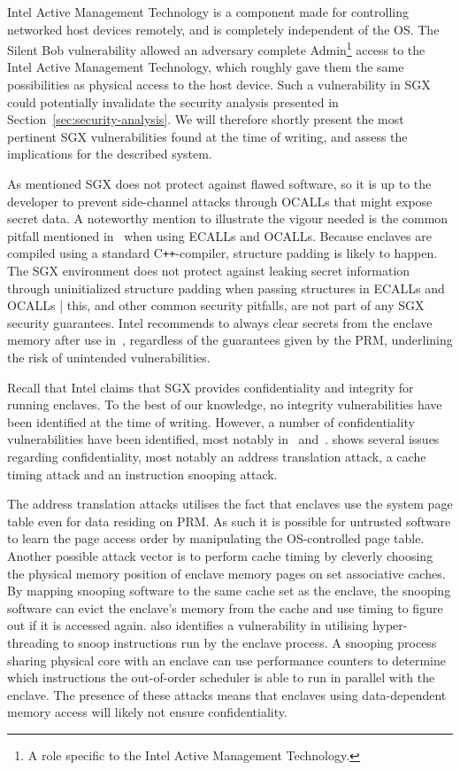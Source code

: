 \documentclass{article}
\newcommand\cpp{C\texttt{++}\xspace}
\begin{document}
    Intel Active Management Technology is a component made for controlling networked host devices remotely, and is completely independent of the OS.
    The Silent Bob vulnerability allowed an adversary complete Admin\footnote{A role specific to the Intel Active Management Technology.} access to the Intel Active Management Technology, which roughly gave them the same possibilities as physical access to the host device.
    Such a vulnerability in SGX could potentially invalidate the security analysis presented in Section~\ref{sec:security-analysis}.
    We will therefore shortly present the most pertinent SGX vulnerabilities found at the time of writing, and assess the implications for the described system.

    As mentioned SGX does not protect against flawed software, so it is up to the developer to prevent side-channel attacks through OCALLs that might expose secret data.
	A noteworthy mention to illustrate the vigour needed is the common pitfall mentioned in~\cite{intel_sgx_guide} when using ECALLs and OCALLs.
	Because enclaves are compiled using a standard \cpp-compiler, structure padding is likely to happen.
	The SGX environment does not protect against leaking secret information through uninitialized structure padding when passing structures in ECALLs and OCALLs | this, and other common security pitfalls, are not part of any SGX security guarantees.
	Intel recommends to always clear secrets from the enclave memory after use in~\cite{intel_sgx_guide}, regardless of the guarantees given by the PRM, underlining the risk of unintended vulnerabilities.

    Recall that Intel claims that SGX provides confidentiality and integrity for running enclaves.
    To the best of our knowledge, no integrity vulnerabilities have been identified at the time of writing.
    However, a number of confidentiality vulnerabilities have been identified, most notably in~\cite{costan_intel_2016} and~\cite{chen_sgxpectre_2018}.
	\cite{costan_intel_2016} shows several issues regarding confidentiality, most notably an address translation attack, a cache timing attack and an instruction snooping attack.

    The address translation attacks utilises the fact that enclaves use the system page table even for data residing on PRM.
    As such it is possible for untrusted software to learn the page access order by manipulating the OS-controlled page table.
	Another possible attack vector is to perform cache timing by cleverly choosing the physical memory position of enclave memory pages on set associative caches.
	By mapping snooping software to the same cache set as the enclave, the snooping software can evict the enclave's memory from the cache and use timing to figure out if it is accessed again.
    \cite{costan_intel_2016} also identifies a vulnerability in utilising hyper-threading to snoop instructions run by the enclave process. A snooping process sharing physical core with an enclave can use performance counters to determine which instructions the out-of-order scheduler is able to run in parallel with the enclave.
	The presence of these attacks means that enclaves using data-dependent memory access will likely not ensure confidentiality.
\end{document}
